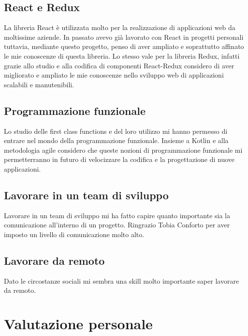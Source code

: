 \subsection{React e Redux}
La libreria React è utilizzata molto per la realizzazione di applicazioni web da moltissime aziende. In passato avevo già lavorato con React in progetti personali tuttavia, mediante questo progetto, penso di aver ampliato e soprattutto affinato le mie conoscenze di questa libreria. Lo stesso vale per la libreria Redux, infatti grazie allo studio e alla codifica di componenti React-Redux considero di aver migliorato e ampliato le mie conoscenze nello sviluppo web di applicazioni scalabili e manutenibili.

\subsection{Programmazione funzionale}
Lo studio delle first class functions e del loro utilizzo mi hanno permesso di entrare nel mondo della programmazione funzionale. Insieme a Kotlin e alla metodologia agile considero che queste nozioni di programmazione funzionale mi permetterranno in futuro di velocizzare la codifica e la progettazione di nuove applicazioni.

\subsection{Lavorare in un team di sviluppo}
Lavorare in un team di sviluppo mi ha fatto capire quanto importante sia la comunicazione all'interno di un progetto. Ringrazio Tobia Conforto per aver imposto un livello di comunicazione molto alto.

\subsection{Lavorare da remoto}
Dato le circostanze sociali mi sembra una skill molto importante saper lavorare da remoto.


\section{Valutazione personale}
